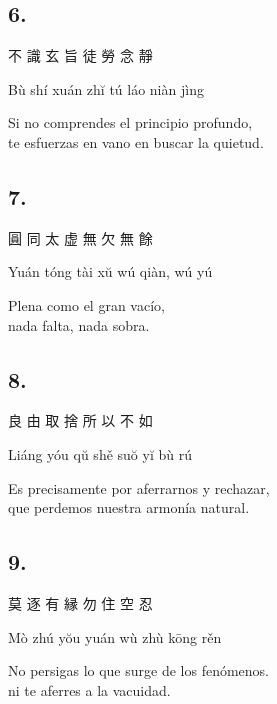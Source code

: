 \documentclass[
  a5paperpaper,
]{article}
\begin{document}
\begin{verseblock}

\hypertarget{section-80}{%
\subsection{6.}\label{section-80}}

不 識 玄 旨 徒 勞 念 靜

Bù shí xuán zhĭ tú láo niàn jìng

Si no comprendes el principio profundo,\\
te esfuerzas en vano en buscar la quietud.

\end{verseblock}

\begin{verseblock}

\hypertarget{section-81}{%
\subsection{7.}\label{section-81}}

圓 同 太 虚 無 欠 無 餘

Yuán tóng tài xŭ wú qiàn, wú yú

Plena como el gran vacío,\\
nada falta, nada sobra.

\end{verseblock}

\begin{verseblock}

\hypertarget{section-82}{%
\subsection{8.}\label{section-82}}

良 由 取 捨 所 以 不 如

Liáng yóu qŭ shě suŏ yĭ bù rú

Es precisamente por aferrarnos y rechazar,\\
que perdemos nuestra armonía natural.

\end{verseblock}

\begin{verseblock}

\hypertarget{section-83}{%
\subsection{9.}\label{section-83}}

莫 逐 有 縁 勿 住 空 忍

Mò zhú yŏu yuán wù zhù kōng rěn

No persigas lo que surge de los fenómenos.\\
ni te aferres a la vacuidad.

\end{verseblock}
\end{document}

